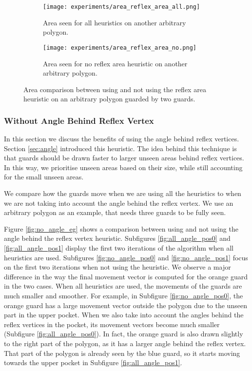 

\begin{figure}[h!]
    \centering
    \begin{subfigure}{0.45\textwidth}
        \texttt{[image: experiments/area\_reflex\_area\_all.png]}
        \caption{Area seen for all heuristics on another arbitrary polygon.}
        \label{fig:area_reflex_area_all}
    \end{subfigure}
    \hfill
    \begin{subfigure}{0.45\textwidth}
        \texttt{[image: experiments/area\_reflex\_area\_no.png]}
        \caption{Area seen for no reflex area heuristic on another arbitrary polygon.}
        \label{fig:area_reflex_area_no}
    \end{subfigure}
    \caption{Area comparison between using and not using the reflex area heuristic on an arbitrary polygon guarded by two guards.}
    \label{fig:area_reflex_area}
\end{figure}

\subsubsection{Without Angle Behind Reflex Vertex}
In this section we  discuss the benefits of using the angle behind reflex vertices. Section \ref{sec:angle} introduced this heuristic. The idea behind this technique is that guards should be drawn faster to larger unseen areas behind reflex vertices. 
In this way, we prioritise unseen areas based on their size, while still accounting for the small unseen areas.

We  compare how the guards move when we are using all the heuristics to when we are not taking into account the angle behind the reflex vertex. We  use an arbitrary polygon as an example, that needs three guards to be fully seen.

Figure \ref{fig:no_angle_eg} shows a comparison between using and not using the angle behind the reflex vertex heuristic. Subfigures \ref{fig:all_angle_pos0} and \ref{fig:all_angle_pos1} display the first two iterations of the algorithm when all heuristics are used. Subfigures \ref{fig:no_angle_pos0} and \ref{fig:no_angle_pos1} focus on the first two iterations when not using the heuristic.
We  observe a major difference in the way the final movement vector is computed for the orange guard in the two cases. When all heuristics are used, the movements of the guards are much smaller and smoother. For example, in Subfigure \ref{fig:no_angle_pos0}, the orange guard has a large movement vector outside the polygon due to the unseen part in the upper pocket. When we also take into account the angles behind the reflex vertices in the pocket, its movement vectors become much smaller (Subfigure \ref{fig:all_angle_pos0}). In fact, the orange guard is also drawn slightly to the right part of the polygon, as it has a larger angle behind the reflex vertex. That part of the polygon is already seen by the blue guard, so it starts moving towards the upper pocket in Subfigure \ref{fig:all_angle_pos1}.

